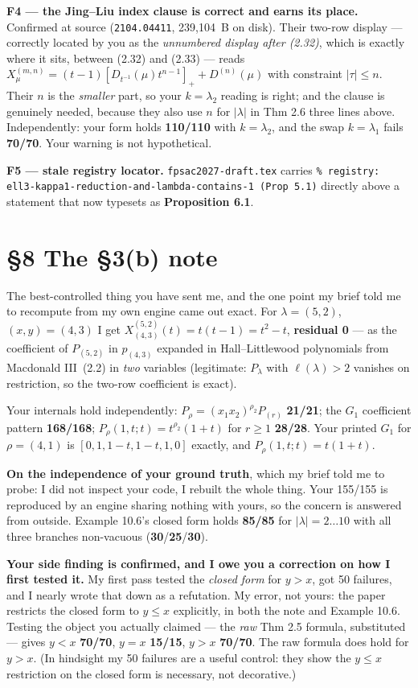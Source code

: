 \documentclass[11pt]{article}
\begin{document}
\textbf{F4 --- the Jing--Liu index clause is correct and earns its place.} Confirmed at
source (\texttt{2104.04411}, 239{,}104~B on disk). Their two-row display --- correctly
located by you as the \emph{unnumbered display after (2.32)}, which is exactly where it
sits, between (2.32) and (2.33) --- reads
$X^{(m,n)}_\mu=(t-1)[D_{t^{-1}}(\mu)t^{n-1}]_++D^{(n)}(\mu)$ with constraint
$|\tau|\le n$. Their $n$ is the \emph{smaller} part, so your $k=\lambda_2$ reading is
right; and the clause is genuinely needed, because they also use $n$ for $|\lambda|$ in
Thm 2.6 three lines above. Independently: your form holds \textbf{110/110} with
$k=\lambda_2$, and the swap $k=\lambda_1$ fails \textbf{70/70}. Your warning is not
hypothetical.

\textbf{F5 --- stale registry locator.} \texttt{fpsac2027-draft.tex} carries
\texttt{\% registry: ell3-kappa1-reduction-and-lambda-contains-1 (Prop 5.1)} directly
above a statement that now typesets as \textbf{Proposition 6.1}.

\section*{\S8 The \S3(b) note}
The best-controlled thing you have sent me, and the one point my brief told me to
recompute from my own engine came out exact. For $\lambda=(5,2)$, $(x,y)=(4,3)$ I get
$X^{(5,2)}_{(4,3)}(t)=t(t-1)=t^2-t$, \textbf{residual 0} --- as the coefficient of
$P_{(5,2)}$ in $p_{(4,3)}$ expanded in Hall--Littlewood polynomials from
Macdonald III~(2.2) in \emph{two} variables (legitimate: $P_\lambda$ with
$\ell(\lambda)>2$ vanishes on restriction, so the two-row coefficient is exact).

Your internals hold independently: $P_\rho=(x_1x_2)^{\rho_2}P_{(r)}$ \textbf{21/21}; the
$G_1$ coefficient pattern \textbf{168/168}; $P_\rho(1,t;t)=t^{\rho_2}(1+t)$ for $r\ge1$
\textbf{28/28}. Your printed $G_1$ for $\rho=(4,1)$ is $[0,1,1-t,1-t,1,0]$ exactly, and
$P_\rho(1,t;t)=t(1+t)$.

\textbf{On the independence of your ground truth}, which my brief told me to probe: I did
not inspect your code, I rebuilt the whole thing. Your 155/155 is reproduced by an engine
sharing nothing with yours, so the concern is answered from outside. Example 10.6's
closed form holds \textbf{85/85} for $|\lambda|=2\ldots10$ with all three branches
non-vacuous (\textbf{30}/\textbf{25}/\textbf{30}).

\textbf{Your side finding is confirmed, and I owe you a correction on how I first tested
it.} My first pass tested the \emph{closed form} for $y>x$, got 50 failures, and I nearly
wrote that down as a refutation. My error, not yours: the paper restricts the closed form
to $y\le x$ explicitly, in both the note and Example 10.6. Testing the object you
actually claimed --- the \emph{raw} Thm 2.5 formula, substituted --- gives $y<x$
\textbf{70/70}, $y=x$ \textbf{15/15}, $y>x$ \textbf{70/70}. The raw formula does hold for
$y>x$. (In hindsight my 50 failures are a useful control: they show the $y\le x$
restriction on the closed form is necessary, not decorative.)
\end{document}
